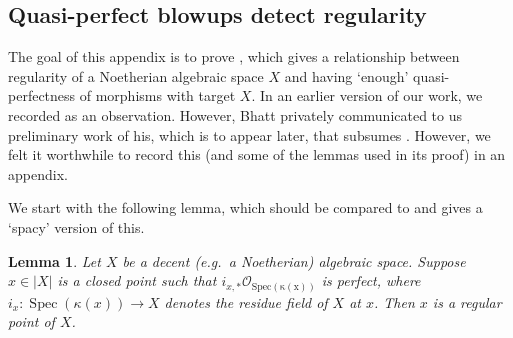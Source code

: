 \documentclass[11pt]{amsart}
\theoremstyle{plain}
\newtheorem{lemma}[theorem]{Lemma}
\theoremstyle{definition}
\numberwithin{equation}{section}
\numberwithin{theorem}{section}
\begin{document}
\begin{appendix}

\section{Quasi-perfect blowups detect regularity}
\label{app:quasi-perfect_detect_regularity}

The goal of this appendix is to prove , which gives a relationship between regularity of a Noetherian algebraic space $X$ and having `enough' quasi-perfectness of morphisms with target $X$. In an earlier version of our work, we recorded  as an observation. However, Bhatt privately communicated to us preliminary work of his, which is to appear later, that subsumes .
However, we felt it worthwhile to record this (and some of the lemmas used in its proof) in an appendix.

We start with the following lemma, which should be compared to \cite[\href{https://stacks.math.columbia.edu/tag/00OC}{Tag 00OC}]{StacksProject} and gives a `spacy' version of this. 

\begin{lemma}
    \label{lem:residue_field_perfect_gives_regular}
    Let $X$ be a decent (e.g.\ a Noetherian) algebraic space.
    Suppose $x\in |X|$ is a closed point such that $i_{x,\ast}\mathcal{O}_{\operatorname{Spec(\kappa(x))}}$ is perfect, where $i_x\colon {\operatorname{Spec}}(\kappa(x))\to X$ denotes the residue field of $X$ at $x$. 
    Then $x$ is a regular point of $X$. 
\end{lemma}


\end{appendix}
\end{document}
